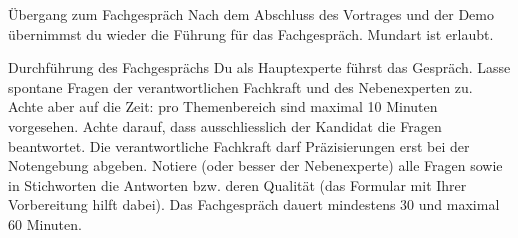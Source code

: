\begin{taskitemwithoutcomment}{Übergang zum Fachgespräch}
  Nach dem Abschluss des Vortrages und der Demo übernimmst du wieder die Führung für das Fachgespräch. Mundart ist erlaubt.
\end{taskitemwithoutcomment}
\begin{taskitemwithoutcomment}{Durchführung des Fachgesprächs}
  Du als Hauptexperte führst das Gespräch. Lasse spontane Fragen der verantwortlichen Fachkraft und des Nebenexperten zu. Achte aber auf die Zeit: pro Themenbereich sind maximal 10 Minuten vorgesehen. Achte darauf, dass ausschliesslich der Kandidat die Fragen beantwortet. Die verantwortliche Fachkraft darf Präzisierungen erst bei der Notengebung abgeben. Notiere (oder besser der Nebenexperte) alle Fragen sowie in Stichworten die Antworten bzw. deren Qualität (das Formular mit Ihrer Vorbereitung hilft dabei). Das Fachgespräch dauert mindestens 30 und maximal 60 Minuten.
\end{taskitemwithoutcomment}